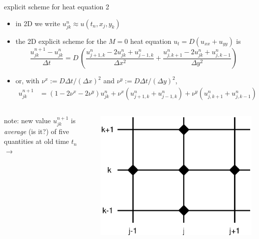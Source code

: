 \begin{frame}{explicit scheme for heat equation 2}

\begin{itemize}
\item in 2D we write $u_{jk}^n \approx u(t_n,x_j,y_k)$
\item the 2D explicit scheme for the $M=0$ heat equation $u_t = D(u_{xx} + u_{yy})$ is
\small
	$$\frac{u_{jk}^{n+1} - u_{jk}^n}{\Delta t} = D\,\left(\frac{u_{j+1,k}^n - 2 u_{jk}^n + u_{j-1,k}^n}{\Delta x^2} + \frac{u_{j,k+1}^n - 2 u_{jk}^n + u_{j,k-1}^n}{\Delta y^2}\right)$$
\normalsize
\item or, with $\nu^x := D \Delta t / (\Delta x)^2$ and $\nu^y := D \Delta t / (\Delta y)^2$,
\small
\begin{align*}
u_{jk}^{n+1} &= (1 - 2 \nu^x - 2 \nu^y) u_{jk}^n + \nu^x \left(u_{j+1,k}^n + u_{j-1,k}^n\right) + \nu^y \left(u_{j,k+1}^n + u_{j,k-1}^n\right)
\end{align*}
\end{itemize}

\begin{columns}[b]
\begin{column}{0.62\textwidth}
note: new value $u_{jk}^{n+1}$ is \emph{average} (is it?) of five quantities at old time $t_n$ \qquad $\longrightarrow$
\end{column}
\begin{column}{0.38\textwidth}
\includegraphics[width=1.1\textwidth]{pdffigs/exp2dstencil}
\end{column}
\end{columns}
\end{frame}


